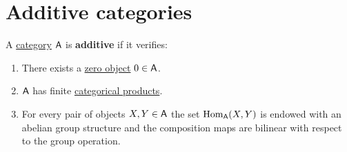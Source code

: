 \documentclass[../../../main]{subfiles}
\begin{document}
\section{Additive categories}
\begin{definition} \label{def:additive-category}
  A \hyperref[def:category]{category} \(\mathsf{A}\) is \textbf{additive} if it verifies:
  \begin{enumerate}[label=A.\arabic*), ref=A.\arabic*]
    \item\label{axiom:additive-zero} There exists a \hyperref[def:zero-object]{zero object} \(0 \in \mathsf{A}\).
    \item\label{axiom:additive-products} \(\mathsf{A}\) has finite \hyperref[def:categorical-product]{categorical products}.
    \item\label{axiom:additive-hom} For every pair of objects \(X, Y \in \mathsf{A}\) the set \(\operatorname{Hom}_{\mathsf{A}}(X, Y)\) is endowed with an abelian group structure and the composition maps are bilinear with respect to the group operation.
  \end{enumerate}
\end{definition}
\end{document}
